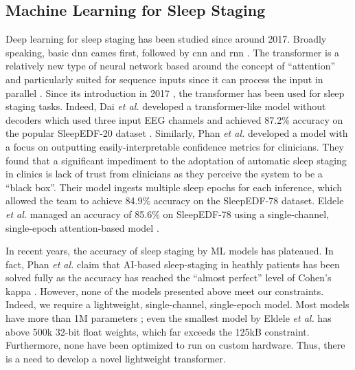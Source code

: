 \subsection{Machine Learning for Sleep Staging}
Deep learning for sleep staging has been studied since around 2017. Broadly speaking, basic \ac{dnn} cames first, followed by \ac{cnn} and \ac{rnn} \cite{phan2022sleeptransformer}. The transformer
is a relatively new type of neural network based around the concept of ``attention'' and particularly suited for sequence inputs since it can process the input in parallel \cite{han2022survey}.
Since its introduction in 2017 \cite{vaswani2017attention}, the transformer has been used for sleep staging tasks. Indeed, Dai \textit{et al.} developed a transformer-like model without decoders
which used three input EEG channels and achieved 87.2\% accuracy on the popular SleepEDF-20 dataset \cite{dai2023multichannelsleepnet}. Similarly, Phan \textit{et al.} developed a model with a
focus on outputting easily-interpretable confidence metrics for clinicians. They found that a significant impediment to the adoptation of automatic sleep staging in clinics is lack of trust from
clinicians as they perceive the system to be a ``black box''. Their model ingests multiple sleep epochs for each inference, which allowed the team to achieve 84.9\% accuracy on the SleepEDF-78
dataset. Eldele \textit{et al.} managed an accuracy of 85.6\% on SleepEDF-78 using a single-channel, single-epoch attention-based model \cite{eldele2021attention}.

In recent years, the accuracy of sleep staging by ML models has plateaued. In fact, Phan \textit{et al.} claim that AI-based sleep-staging in heathly patients has been solved fully as the
accuracy has reached the ``almost perfect'' level of Cohen's kappa \cite{phan2022automatic}. However, none of the models presented above meet our constraints. Indeed, we require a lightweight,
single-channel, single-epoch model. Most models have more than 1M parameters \cite{phan2022sleeptransformer}; even the smallest model by Eldele \textit{et al.} has above 500k 32-bit float
weights, which far exceeds the 125kB constraint. Furthermore, none have been optimized to run on custom hardware. Thus, there is a need to develop a novel lightweight transformer.


